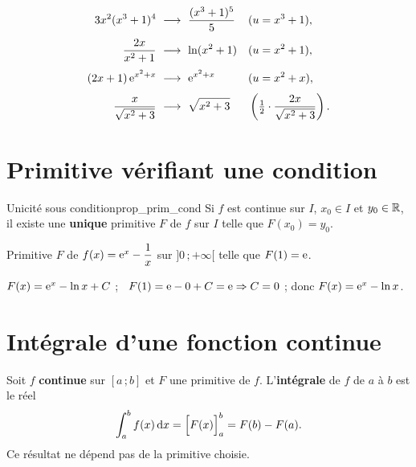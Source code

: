 \begin{exemple}
	\[
	\begin{aligned}
	3x^{2}(x^{3}+1)^{4} &\ \longrightarrow\ \frac{(x^{3}+1)^{5}}{5}
	&&(u=x^{3}+1),\\[0.3em]
	\frac{2x}{x^{2}+1} &\ \longrightarrow\ \ln(x^{2}+1)
	&&(u=x^{2}+1),\\[0.3em]
	(2x+1)\,\mathrm{e}^{x^{2}+x} &\ \longrightarrow\ \mathrm{e}^{x^{2}+x}
	&&(u=x^{2}+x),\\[0.3em]
	\frac{x}{\sqrt{x^{2}+3}} &\ \longrightarrow\ \sqrt{x^{2}+3}
	&&\left(\tfrac12\cdot\dfrac{2x}{\sqrt{x^{2}+3}}\right).
	\end{aligned}
	\]
\end{exemple}


\section{Primitive vérifiant une condition}

\begin{propriete}{Unicité sous condition}{prop_prim_cond}
	Si $f$ est continue sur $I$, $x_0\in I$ et $y_0\in\mathbb{R}$, il existe une
	\textbf{unique} primitive $F$ de $f$ sur $I$ telle que $F(x_0)=y_0$.
\end{propriete}

\begin{exemple}
	Primitive $F$ de $f(x)=\mathrm{e}^{x}-\dfrac{1}{x}$ sur $]0\,;+\infty[$ telle que
	$F(1)=\mathrm{e}$.

	$F(x)=\mathrm{e}^{x}-\ln x+C$ ; \ $F(1)=\mathrm{e}-0+C=\mathrm{e}\Rightarrow C=0$ ;
	donc $F(x)=\mathrm{e}^{x}-\ln x$.
\end{exemple}


\section{Intégrale d'une fonction continue}

\begin{definition}
	Soit $f$ \textbf{continue} sur $[a\,;b]$ et $F$ une primitive de $f$.
	L'\textbf{intégrale} de $f$ de $a$ à $b$ est le réel
	\[
	\int_a^b f(x)\,\mathrm{d} x=\Bigl[F(x)\Bigr]_a^b=F(b)-F(a).
	\]
	Ce résultat ne dépend pas de la primitive choisie.
\end{definition}

